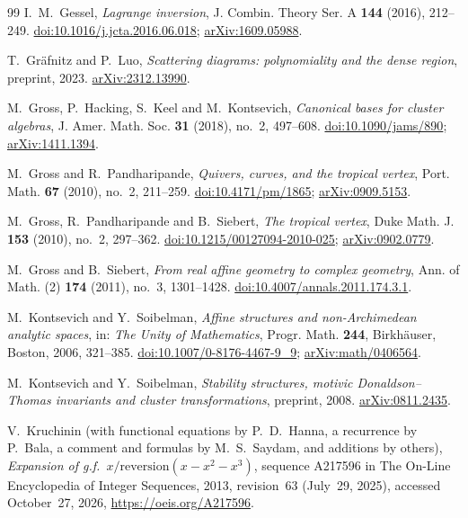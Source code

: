 \documentclass[11pt]{article}
\theoremstyle{definition}
\theoremstyle{remark}
\numberwithin{equation}{section}
\begin{document}
\begin{thebibliography}{99}
I.~M.~Gessel,
\emph{Lagrange inversion},
J. Combin. Theory Ser. A \textbf{144} (2016), 212--249.
\href{https://doi.org/10.1016/j.jcta.2016.06.018}{doi:10.1016/j.jcta.2016.06.018};
\href{https://arxiv.org/abs/1609.05988}{arXiv:1609.05988}.

T.~Gr\"afnitz and P.~Luo,
\emph{Scattering diagrams: polynomiality and the dense region},
preprint, 2023.
\href{https://arxiv.org/abs/2312.13990}{arXiv:2312.13990}.

M.~Gross, P.~Hacking, S.~Keel and M.~Kontsevich,
\emph{Canonical bases for cluster algebras},
J. Amer. Math. Soc. \textbf{31} (2018), no.~2, 497--608.
\href{https://doi.org/10.1090/jams/890}{doi:10.1090/jams/890};
\href{https://arxiv.org/abs/1411.1394}{arXiv:1411.1394}.

M.~Gross and R.~Pandharipande,
\emph{Quivers, curves, and the tropical vertex},
Port. Math. \textbf{67} (2010), no.~2, 211--259.
\href{https://doi.org/10.4171/pm/1865}{doi:10.4171/pm/1865};
\href{https://arxiv.org/abs/0909.5153}{arXiv:0909.5153}.

M.~Gross, R.~Pandharipande and B.~Siebert,
\emph{The tropical vertex},
Duke Math. J. \textbf{153} (2010), no.~2, 297--362.
\href{https://doi.org/10.1215/00127094-2010-025}{doi:10.1215/00127094-2010-025};
\href{https://arxiv.org/abs/0902.0779}{arXiv:0902.0779}.

M.~Gross and B.~Siebert,
\emph{From real affine geometry to complex geometry},
Ann. of Math. (2) \textbf{174} (2011), no.~3, 1301--1428.
\href{https://doi.org/10.4007/annals.2011.174.3.1}{doi:10.4007/annals.2011.174.3.1}.

M.~Kontsevich and Y.~Soibelman,
\emph{Affine structures and non-Archimedean analytic spaces},
in: \emph{The Unity of Mathematics}, Progr. Math. \textbf{244},
Birkh\"auser, Boston, 2006, 321--385.
\href{https://doi.org/10.1007/0-8176-4467-9_9}{doi:10.1007/0-8176-4467-9\_9};
\href{https://arxiv.org/abs/math/0406564}{arXiv:math/0406564}.

M.~Kontsevich and Y.~Soibelman,
\emph{Stability structures, motivic Donaldson--Thomas invariants and
cluster transformations}, preprint, 2008.
\href{https://arxiv.org/abs/0811.2435}{arXiv:0811.2435}.

V.~Kruchinin (with functional equations by P.~D.~Hanna, a recurrence by
P.~Bala, a comment and formulas by M.~S.~Saydam, and additions by others),
\emph{Expansion of g.f.\ $x/\mathrm{reversion}(x-x^2-x^3)$}, sequence
A217596 in The On-Line Encyclopedia of Integer Sequences, 2013,
revision~63 (July~29, 2025), accessed October~27, 2026,
\url{https://oeis.org/A217596}.


\end{thebibliography}
\end{document}
